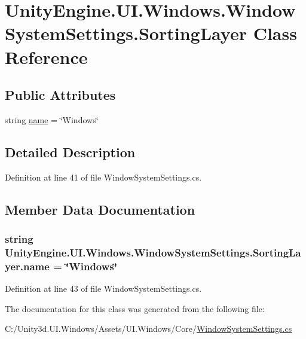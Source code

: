 \hypertarget{class_unity_engine_1_1_u_i_1_1_windows_1_1_window_system_settings_1_1_sorting_layer}{}\section{Unity\+Engine.\+U\+I.\+Windows.\+Window\+System\+Settings.\+Sorting\+Layer Class Reference}
\label{class_unity_engine_1_1_u_i_1_1_windows_1_1_window_system_settings_1_1_sorting_layer}
\subsection*{Public Attributes}
\begin{DoxyCompactItemize}
\item 
string \hyperlink{class_unity_engine_1_1_u_i_1_1_windows_1_1_window_system_settings_1_1_sorting_layer_a90e03040f8ee7e2d046a7de07a5db74b}{name} = \char`\"{}Windows\char`\"{}
\end{DoxyCompactItemize}


\subsection{Detailed Description}


Definition at line 41 of file Window\+System\+Settings.\+cs.



\subsection{Member Data Documentation}
\hypertarget{class_unity_engine_1_1_u_i_1_1_windows_1_1_window_system_settings_1_1_sorting_layer_a90e03040f8ee7e2d046a7de07a5db74b}{}
\subsubsection[{name}]{\setlength{\rightskip}{0pt plus 5cm}string Unity\+Engine.\+U\+I.\+Windows.\+Window\+System\+Settings.\+Sorting\+Layer.\+name = \char`\"{}Windows\char`\"{}}\label{class_unity_engine_1_1_u_i_1_1_windows_1_1_window_system_settings_1_1_sorting_layer_a90e03040f8ee7e2d046a7de07a5db74b}


Definition at line 43 of file Window\+System\+Settings.\+cs.



The documentation for this class was generated from the following file\+:\begin{DoxyCompactItemize}
\item 
C\+:/\+Unity3d.\+U\+I.\+Windows/\+Assets/\+U\+I.\+Windows/\+Core/\hyperlink{_window_system_settings_8cs}{Window\+System\+Settings.\+cs}\end{DoxyCompactItemize}
